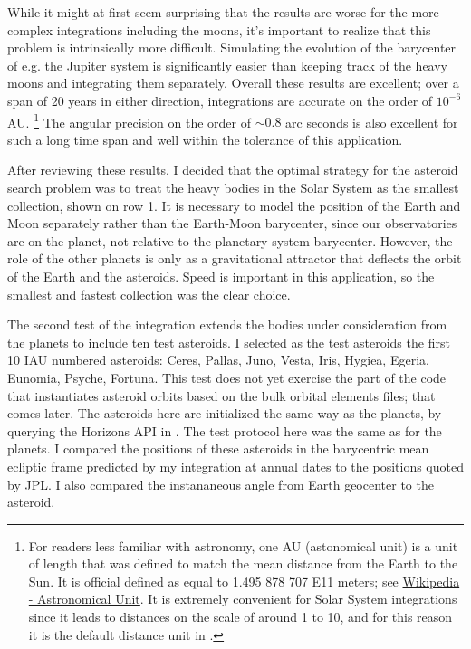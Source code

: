 While it might at first seem surprising that the results are worse for the more complex integrations including the moons,
it's important to realize that this problem is intrinsically more difficult.
Simulating the evolution of the barycenter of e.g. the Jupiter system is significantly easier than keeping track of the heavy moons and integrating them separately.
Overall these results are excellent; over a span of 20 years in either direction, integrations are accurate on the order of $10^{-6}$ AU.
\footnote{For readers less familiar with astronomy, one AU (astonomical unit) is a unit of length that was defined to match the mean distance from the Earth to the Sun.
It is official defined as equal to 1.495 878 707 E11 meters; see \href{https://en.wikipedia.org/wiki/Astronomical_unit}{Wikipedia - Astronomical Unit}.
It is extremely convenient for Solar System integrations since it leads to distances on the scale of around 1 to 10, 
and for this reason it is the default distance unit in .}
The angular precision on the order of $\sim 0.8$ arc seconds is also excellent for such a long time span and well within the tolerance of this application.

After reviewing these results, I decided that the optimal strategy for the asteroid search problem was to treat the heavy bodies 
in the Solar System as the smallest collection, shown on row 1.
It is necessary to model the position of the Earth and Moon separately rather than the Earth-Moon barycenter, 
since our observatories are on the planet, not relative to the planetary system barycenter.
However, the role of the other planets is only as a gravitational attractor that deflects the orbit of the Earth and the asteroids.
Speed is important in this application, so the smallest and fastest collection was the clear choice.

The second test of the integration extends the bodies under consideration from the planets to include ten test asteroids.
I selected as the test asteroids the first 10 IAU numbered asteroids: Ceres, Pallas, Juno, Vesta, Iris, Hygiea, Egeria, Eunomia, Psyche, Fortuna.
This test does not yet exercise the part of the code that instantiates asteroid orbits based on the bulk orbital elements files; that comes later.
The asteroids here are initialized the same way as the planets, by querying the Horizons API in .
The test protocol here was the same as for the planets.
I compared the positions of these asteroids in the barycentric mean ecliptic frame predicted by my integration at annual dates to the positions quoted by JPL.
I also compared the instananeous angle from Earth geocenter to the asteroid. \\

